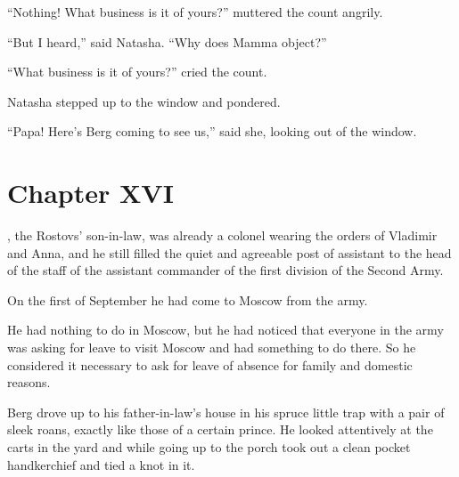 ``Nothing! What business is it of yours?'' muttered the count
angrily.

``But I heard,'' said Natasha. ``Why does Mamma object?''

``What business is it of yours?'' cried the count.

Natasha stepped up to the window and pondered.

``Papa! Here's Berg coming to see us,'' said she, looking out of
the window.


\chapter*{Chapter XVI} \ifaudio {}
\fi

, the Rostovs' son-in-law, was already a colonel wearing the
orders of Vladimir and Anna, and he still filled the quiet and
agreeable post of assistant to the head of the staff of the
assistant commander of the first division of the Second Army.

On the first of September he had come to Moscow from the army.

He had nothing to do in Moscow, but he had noticed that everyone
in the army was asking for leave to visit Moscow and had
something to do there.  So he considered it necessary to ask for
leave of absence for family and domestic reasons.

Berg drove up to his father-in-law's house in his spruce little
trap with a pair of sleek roans, exactly like those of a certain
prince. He looked attentively at the carts in the yard and while
going up to the porch took out a clean pocket handkerchief and
tied a knot in it.

